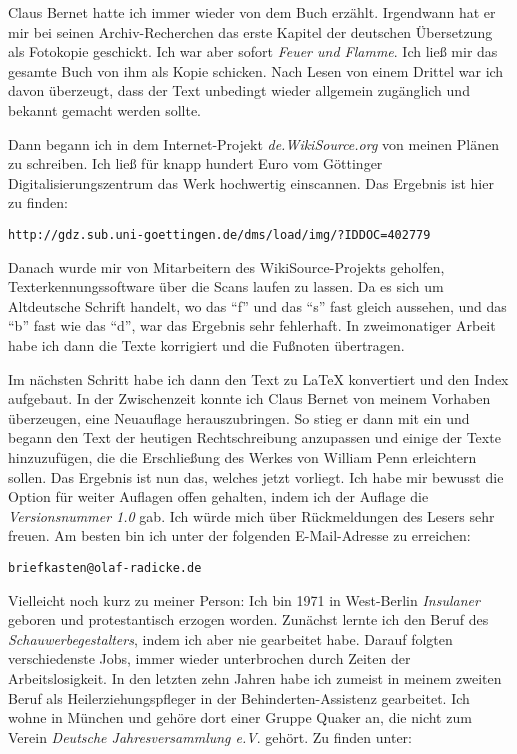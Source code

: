 \medskip

Claus Bernet hatte ich immer wieder von dem Buch erzählt. Irgendwann hat er mir
bei seinen Archiv-Recherchen das erste Kapitel der deutschen Übersetzung als
Fotokopie geschickt. Ich war aber sofort \textit{Feuer und
Flamme}. Ich ließ mir das gesamte Buch von ihm als Kopie schicken. Nach Lesen von einem Drittel war
ich davon überzeugt, dass der Text unbedingt wieder allgemein zugänglich und
bekannt gemacht werden sollte.

\medskip

Dann begann ich in dem Internet-Projekt \textit{de.WikiSource.org} von meinen Plänen
zu schreiben. Ich ließ für knapp hundert Euro vom Göttinger
Digitalisierungszentrum das Werk hochwertig einscannen. Das Ergebnis ist hier zu
finden:

\begin{center}
\texttt{http://gdz.sub.uni-goettingen.de/dms/load/img/?IDDOC=402779}
\end{center}

Danach wurde mir von Mitarbeitern des WikiSource-Projekts geholfen,
Texterkennungssoftware über die Scans laufen zu lassen. Da es sich um
Altdeutsche Schrift handelt, wo das "`f"' und das "`s"' fast gleich aussehen,
und das "`b"' fast wie das "`d"', war das Ergebnis sehr fehlerhaft. In
zweimonatiger Arbeit habe ich dann die Texte korrigiert und die Fußnoten
übertragen.

\medskip

Im nächsten Schritt habe ich dann den Text zu \LaTeX{} konvertiert und den Index
aufgebaut. In der Zwischenzeit konnte ich Claus Bernet von meinem Vorhaben überzeugen, eine
Neuauflage herauszubringen. So stieg er dann mit ein und begann
den Text der heutigen Rechtschreibung anzupassen und einige der Texte hinzuzufügen, die die 
Erschließung des Werkes von William Penn erleichtern sollen.
Das Ergebnis ist nun das, welches jetzt vorliegt. Ich habe mir bewusst die
Option für weiter Auflagen offen gehalten, indem ich der Auflage die
\textit{Versionsnummer 1.0} gab. Ich würde mich über Rückmeldungen des Lesers
sehr freuen. Am besten bin ich unter der folgenden E-Mail-Adresse zu erreichen:

\begin{center}
\texttt{briefkasten@olaf-radicke.de}
\end{center}

Vielleicht noch kurz zu meiner Person: Ich bin 1971 in West-Berlin
\textit{Insulaner} geboren und protestantisch erzogen worden. Zunächst lernte
ich den Beruf des \textit{Schauwerbegestalters}, indem ich aber nie gearbeitet
habe. Darauf folgten verschiedenste Jobs, immer wieder unterbrochen durch Zeiten
der Arbeitslosigkeit. In den letzten zehn Jahren habe ich zumeist in meinem
zweiten Beruf als Heilerziehungspfleger in der Behinderten-Assistenz gearbeitet.
Ich wohne in München und gehöre dort einer Gruppe Quaker an, die nicht zum
Verein \textit{Deutsche Jahresversammlung e.V}. gehört. Zu finden unter:

